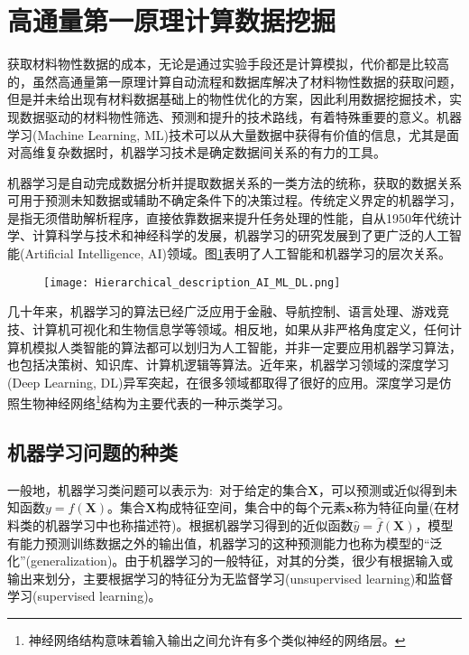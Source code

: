 \section{高通量第一原理计算数据挖掘}\label{chap:datamining} 
获取材料物性数据的成本，无论是通过实验手段还是计算模拟，代价都是比较高的，虽然高通量第一原理计算自动流程和数据库解决了材料物性数据的获取问题，但是并未给出现有材料数据基础上的物性优化的方案，因此利用数据挖掘技术，实现数据驱动的材料物性筛选、预测和提升的技术路线，有着特殊重要的意义。机器学习\textrm{(Machine Learning, ML)}技术可以从大量数据中获得有价值的信息，尤其是面对高维复杂数据时，机器学习技术是确定数据间关系的有力的工具。

机器学习是自动完成数据分析并提取数据关系的一类方法的统称，获取的数据关系可用于预测未知数据或辅助不确定条件下的决策过程\cite{ML_2012}。传统定义界定的机器学习，是指无须借助解析程序，直接依靠数据来提升任务处理的性能\cite{IBMJRD3-211_1959}，自从1950年代统计学、计算科学与技术和神经科学的发展，机器学习的研究发展到了更广泛的人工智能\textrm{(Artificial Intelligence, AI)}领域。图\ref{AI-ML}表明了人工智能和机器学习的层次关系。
\begin{figure}[h!]
\centering
\vspace*{-0.1in}
\texttt{[image: Hierarchical\_description\_AI\_ML\_DL.png]}
\caption{\fontsize{7.2pt}{4.2pt}}%
\label{AI-ML}
\end{figure}

几十年来，机器学习的算法已经广泛应用于金融、导航控制、语言处理、游戏竞技、计算机可视化和生物信息学等领域。相反地，如果从非严格角度定义，任何计算机模拟人类智能的算法都可以划归为人工智能，并非一定要应用机器学习算法，也包括决策树、知识库、计算机逻辑等算法。近年来，机器学习领域的深度学习\textrm{(Deep Learning, DL)}异军突起，在很多领域都取得了很好的应用\cite{DL_2016}。深度学习是仿照生物神经网络\footnote{神经网络结构意味着输入输出之间允许有多个类似神经的网络层。}结构为主要代表的一种示类学习。

\subsection{机器学习问题的种类}
一般地，机器学习类问题可以表示为:~对于给定的集合$\mathbf{X}$，可以预测或近似得到未知函数$y=f(\mathbf{X})$\cite{ML-CI}。集合$\mathbf{X}$构成特征空间，集合中的每个元素$\mathbf{x}$称为特征向量(在材料类的机器学习中也称描述符)。根据机器学习得到的近似函数$\hat{y}=\hat{f}(\mathbf{X})$，模型有能力预测训练数据之外的输出值，机器学习的这种预测能力也称为模型的“泛化”\textrm{(generalization)}。由于机器学习的一般特征，对其的分类，很少有根据输入或输出来划分，主要根据学习的特征分为无监督学习\textrm{(unsupervised learning)}和监督学习\textrm{(supervised learning)}。

